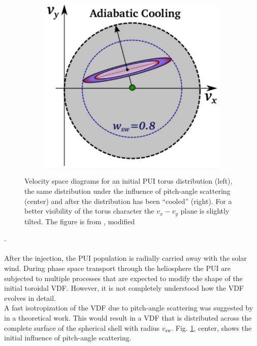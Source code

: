 \begin{figure}
\begin{subfigure}{.32\textwidth}
	\end{subfigure}
	\begin{subfigure}{.32\textwidth}
		\centering
		\includegraphics[width=1.\linewidth]{Figures/Cooling.pdf}
	\end{subfigure}
	\caption{Velocity space diagrams for an initial PUI torus distribution (left), the same distribution under the influence of pitch-angle scattering (center) and after the distribution has been ``cooled'' (right). For a better visibility of the torus character the $v_x-v_y$ plane is slightly tilted. The figure is from \citet{drews_2015}, modified}
	\label{fig:pu}
\end{figure}
.
\\ \\
After the injection, the PUI population is radially carried away with the solar wind. During phase space transport through the heliosphere the PUI are subjected to multiple processes that are expected to modify the shape of the initial toroidal VDF. However, it is not completely understood how the VDF evolves in detail.
\\
A fast isotropization of the VDF due to pitch-angle scattering was suggested by \citet{vasyl_siscoe_1976} in a theoretical work. This would result in a VDF that is distributed across the complete surface of the spherical shell with radius $v_{\mathrm{sw}}$. Fig. \ref{fig:pu}, center, shows the initial influence of pitch-angle scattering. \\

